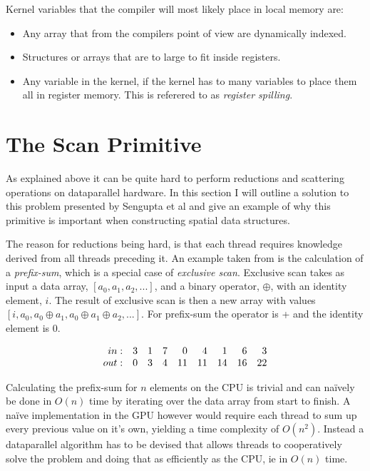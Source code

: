 Kernel variables that the compiler will most likely place in local
memory are:

\begin{itemize}
  \item Any array that from the compilers point of view are
    dynamically indexed.
  \item Structures or arrays that are to large to fit inside registers.
  \item Any variable in the kernel, if the kernel has to many
    variables to place them all in register memory. This is referered
    to as \textit{register spilling}.
\end{itemize}



\section{The Scan Primitive}\label{sec:GPUprims}


As explained above it can be quite hard to perform reductions and
scattering operations on dataparallel hardware. In this section I will
outline a solution to this problem presented by Sengupta et
al and give an example of why this primitive
is important when constructing spatial data structures.


The reason for reductions being hard, is that each thread requires
knowledge derived from all threads preceding it. An example taken from
 is the calculation of a \textit{prefix-sum},
which is a special case of \textit{exclusive scan}. Exclusive scan
takes as input a data array, $[a_0, a_1, a_2, ...]$, and a binary
operator, $\oplus$, with an identity element, $i$. The result of
exclusive scan is then a new array with values $[i, a_0, a_0 \oplus
  a_1, a_0 \oplus a_1 \oplus a_2, ...]$. For prefix-sum the operator
is + and the identity element is 0.

\begin{displaymath}
  \begin{array}{r r r r r r r r r}
    in: & 3 & 1 & 7 & 0 & 4 & 1 & 6 & 3 \\
    out: & 0 & 3 & 4 & 11 & 11 & 14 & 16 & 22 \\
  \end{array}
\end{displaymath}

Calculating the prefix-sum for $n$ elements on the CPU is trivial and
can naïvely be done in $O(n)$ time by iterating over the data array
from start to finish. A naïve implementation in the GPU however would
require each thread to sum up every previous value on it's own,
yielding a time complexity of $O(n^2)$. Instead a dataparallel
algorithm has to be devised that allows threads to cooperatively solve
the problem and doing that as efficiently as the CPU, ie in $O(n)$
time.


